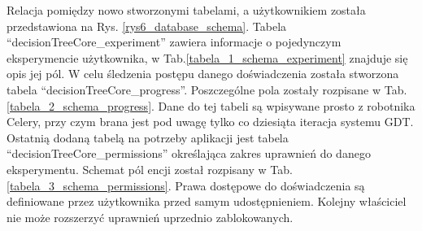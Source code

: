 Relacja pomiędzy nowo stworzonymi tabelami, a użytkownikiem została przedstawiona na Rys. \ref{rys6_database_schema}. Tabela \enquote{decisionTreeCore\_experiment} zawiera informacje o pojedynczym eksperymencie użytkownika, w Tab.\ref{tabela_1_schema_experiment} znajduje się opis jej pól. W celu śledzenia postępu danego doświadczenia została stworzona tabela \enquote{decisionTreeCore\_progress}. Poszczególne pola zostały rozpisane w Tab.\ref{tabela_2_schema_progress}. Dane do tej tabeli są wpisywane prosto z robotnika Celery, przy czym brana jest pod uwagę tylko co dziesiąta iteracja systemu GDT. Ostatnią dodaną tabelą na potrzeby aplikacji jest tabela  \enquote{decisionTreeCore\_permissions} określająca zakres uprawnień do danego eksperymentu. Schemat pól encji został rozpisany w Tab.\ref{tabela_3_schema_permissions}. Prawa dostępowe do doświadczenia są definiowane przez użytkownika przed samym udostępnieniem. Kolejny właściciel nie może rozszerzyć uprawnień uprzednio zablokowanych.  


